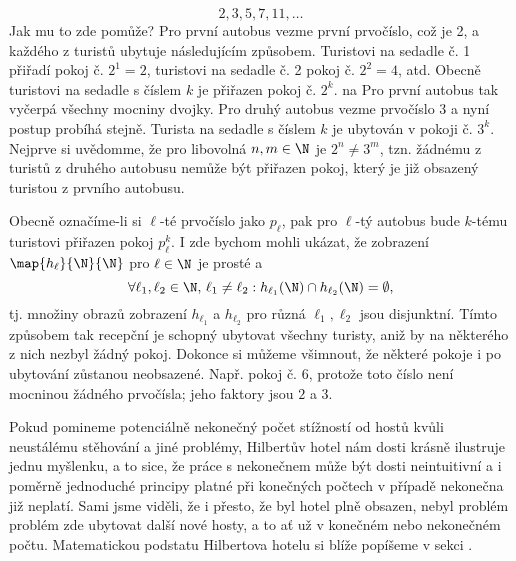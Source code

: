 \begin{enumerate}[label=\textit{(\roman*)}]
    \begin{equation*}
        2,3,5,7,11,\dots
    \end{equation*}
    Jak mu to zde pomůže? Pro první autobus vezme první prvočíslo, což je 2, a každého z turistů ubytuje následujícím způsobem. Turistovi na sedadle č. 1 přiřadí pokoj č. $2^1=2$, turistovi na sedadle č. 2 pokoj č. $2^2=4$, atd. Obecně turistovi na sedadle s číslem $k$ je přiřazen pokoj č. $2^k$. na  Pro první autobus tak vyčerpá všechny mocniny dvojky. Pro druhý autobus vezme prvočíslo 3 a nyní postup probíhá stejně. Turista na sedadle s číslem $k$ je ubytován v pokoji č. $3^k$. Nejprve si uvědomme, že pro libovolná $n,m\in\N$ je $2^n\neq 3^m$, tzn. žádnému z turistů z druhého autobusu nemůže být přiřazen pokoj, který je již obsazený turistou z prvního autobusu.\par
    Obecně označíme-li si $\ell$-té prvočíslo jako $p_\ell$, pak pro $\ell$-tý autobus bude $k$-tému turistovi přiřazen pokoj $p_\ell^k$. I zde bychom mohli ukázat, že zobrazení $\map{h_\ell}{\N}{\N}$ pro $\ell\in\N$ je prosté a
    \begin{equation*}
        \forall\ell_1,\ell_2\in\N,\,\ell_1\neq\ell_2: h_{\ell_1}(\N)\cap h_{\ell_2}(\N)=\emptyset,
    \end{equation*}
    tj. množiny obrazů zobrazení $h_{\ell_1}$ a $h_{\ell_2}$ pro různá $\ell_1,\ell_2$ jsou disjunktní. Tímto způsobem tak recepční je schopný ubytovat všechny turisty, aniž by na některého z nich nezbyl žádný pokoj. Dokonce si můžeme všimnout, že některé pokoje i po ubytování zůstanou neobsazené. Např. pokoj č. 6, protože toto číslo není mocninou žádného prvočísla; jeho faktory jsou $2$ a $3$. 

\end{enumerate}
Pokud pomineme potenciálně nekonečný počet stížností od hostů kvůli neustálému stěhování a jiné problémy, Hilbertův hotel nám dosti krásně ilustruje jednu myšlenku, a to sice, že práce s nekonečnem může být dosti neintuitivní a i poměrně jednoduché principy platné při konečných počtech v případě nekonečna již neplatí. Sami jsme viděli, že i přesto, že byl hotel plně obsazen, nebyl problém problém zde ubytovat další nové hosty, a to ať už v konečném nebo nekonečném počtu. Matematickou podstatu Hilbertova hotelu si blíže popíšeme v sekci .